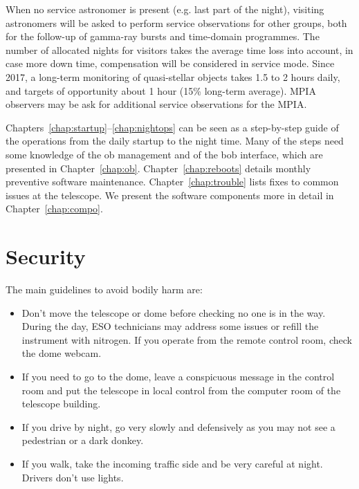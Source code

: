 \documentclass[11pt,fleqn]{book}
\begin{document}
When no service astronomer is present (e.g. last part of the night), visiting astronomers will be asked to perform service observations for other groups, both for the follow-up of gamma-ray bursts and time-domain programmes.  The number of allocated nights for visitors takes the average time loss into account, in case more down time, compensation will be considered in service mode.  Since 2017, a long-term monitoring of quasi-stellar objects takes 1.5 to 2 hours daily, and targets of opportunity about 1 hour (15\% long-term average).  MPIA observers may be ask for additional service observations for the MPIA.

Chapters~\ref{chap:startup}--\ref{chap:nightops} can be seen as a step-by-step
guide of the operations from the daily startup to the night time. Many of the
steps need some knowledge of the \gls{ob} management and of the \gls{bob}
interface, which are presented in Chapter~\ref{chap:ob}.
Chapter~\ref{chap:reboots} details monthly preventive software maintenance.
Chapter~\ref{chap:trouble} lists fixes to common issues at the telescope.  We
present the software components more in detail in Chapter~\ref{chap:compo}.

\section{Security}

The main guidelines to avoid bodily harm are:
\begin{itemize}
\item Don't move the telescope or dome before checking no one is in the way.  During the day, ESO technicians may address some issues or refill the instrument with nitrogen.  If you operate from the remote control room, check the dome webcam.
\item If you need to go to the dome, leave a conspicuous message in the control room and put the telescope in local control from the computer room of the telescope building.
\item If you drive by night, go very slowly and defensively as you may not see a pedestrian or a dark donkey.  
\item If you walk, take the incoming traffic side and be very careful at night. Drivers don't use lights.
\end{itemize}
\end{document}
